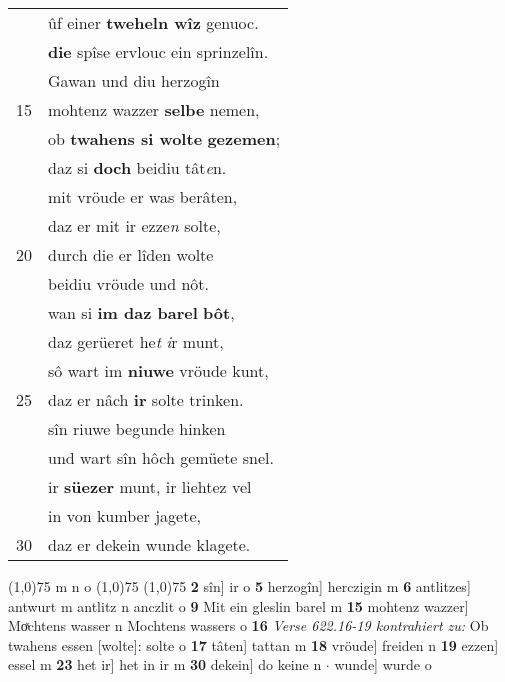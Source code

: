 \documentclass[8pt,a4paper,notitlepage]{article}
\begin{document}
\begin{table}[ht]
\begin{minipage}[t]{0.5\linewidth}
\begin{tabular}{rl}
 & ûf einer \textbf{tweheln wîz} genuoc.\\ 
 & \textbf{die} spîse ervlouc ein sprinzelîn.\\ 
 & Gawan und diu herzogîn\\ 
15 & mohtenz wazzer \textbf{selbe} nemen,\\ 
 & ob \textbf{twahens si wolte} \textbf{gezemen};\\ 
 & daz si \textbf{doch} beidiu tât\textit{e}n.\\ 
 & mit vröude er was berâten,\\ 
 & daz er mit ir ezze\textit{n} solte,\\ 
20 & durch die er lîden wolte\\ 
 & beidiu vröude und nôt.\\ 
 & wan si \textbf{im daz barel} \textbf{bôt},\\ 
 & daz gerüeret he\textit{t} \textit{i}r munt,\\ 
 & sô wart im \textbf{niuwe} vröude kunt,\\ 
25 & daz er nâch \textbf{ir} solte trinken.\\ 
 & sîn riuwe begunde hinken\\ 
 & und wart sîn hôch gemüete snel.\\ 
 & ir \textbf{süezer} munt, ir liehtez vel\\ 
 & in von kumber jagete,\\ 
30 & daz er dekein wunde klagete.\\ 
\end{tabular}
\scriptsize
\line(1,0){75} \newline
m n o \newline
\line(1,0){75} \newline
\newline
\line(1,0){75} \newline
\textbf{2} sîn] ir o \textbf{5} herzogîn] herczigin m \textbf{6} antlitzes] antwurt m antlitz n anczlit o \textbf{9} Mit ein gleslin barel m \textbf{15} mohtenz wazzer] Moͯchtens wasser n Mochtens wassers o \textbf{16} \textit{Verse 622.16-19 kontrahiert zu:} Ob twahens essen [wolte]: solte o  \textbf{17} tâten] tattan m \textbf{18} vröude] freiden n \textbf{19} ezzen] essel m \textbf{23} het ir] het in ir m \textbf{30} dekein] do keine n  $\cdot$ wunde] wurde o \newline
\end{minipage}
\end{table}
\newpage
\end{document}
